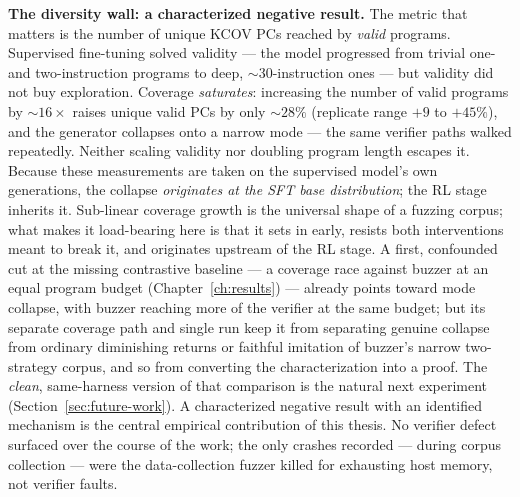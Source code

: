\textbf{The diversity wall: a characterized negative result.}
The metric that matters is the number of unique KCOV PCs reached by \emph{valid}
programs. Supervised fine-tuning solved validity --- the model progressed from
trivial one- and two-instruction programs to deep, ${\sim}30$-instruction ones ---
but validity did not buy exploration. Coverage \emph{saturates}: increasing the
number of valid programs by ${\sim}16\times$ raises unique valid PCs by only
${\sim}28\%$ (replicate range $+9$ to $+45\%$), and the generator collapses onto a
narrow mode --- the same verifier paths walked repeatedly. Neither scaling validity
nor doubling program length escapes it.
Because these measurements are taken on the supervised model's own generations, the
collapse \emph{originates at the SFT base distribution}; the RL stage inherits it.
Sub-linear coverage growth is the universal shape of a fuzzing corpus; what makes it
load-bearing here is that it sets in early, resists both interventions meant to
break it, and originates upstream of the RL stage. A first, confounded cut at the
missing contrastive baseline --- a coverage race against buzzer at an equal program
budget (Chapter~\ref{ch:results}) --- already points toward mode collapse, with
buzzer reaching more of the verifier at the same budget; but its separate coverage
path and single run keep it from separating genuine collapse from ordinary
diminishing returns or faithful imitation of buzzer's narrow two-strategy corpus, and
so from converting the characterization into a proof. The \emph{clean}, same-harness
version of that comparison is the natural next experiment
(Section~\ref{sec:future-work}). A characterized negative result with an identified
mechanism is the central empirical contribution of this thesis. No verifier defect
surfaced over the course of the work; the only crashes recorded --- during corpus
collection --- were the data-collection fuzzer killed for exhausting host memory, not
verifier faults.

